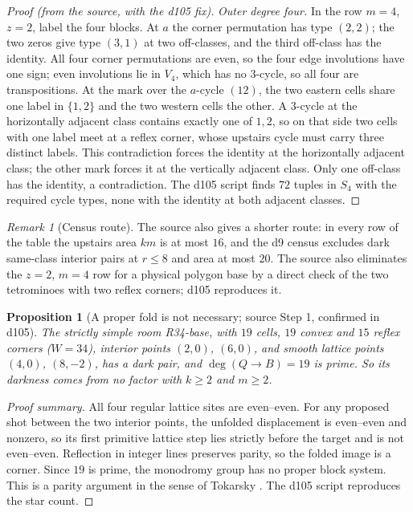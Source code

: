 \documentclass[11pt]{article}
\newtheorem{proposition}{Proposition}
\theoremstyle{definition}
\theoremstyle{remark}
\newtheorem{remark}{Remark}
\newcommand{\src}[1]{\path{#1}}
\begin{document}
\begin{proof}[Proof (from the source, with the d105 fix)]
\emph{Outer degree four.} In the row $m=4$, $z=2$, label the four blocks. At
$a$ the corner permutation has type $(2,2)$; the two zeros give type $(3,1)$ at
two off-classes, and the third off-class has the identity. All four corner
permutations are even, so the four edge involutions have one sign; even
involutions lie in $V_4$, which has no $3$-cycle, so all four are
transpositions. At the mark over the $a$-cycle $(12)$, the two eastern cells
share one label in $\{1,2\}$ and the two western cells the other. A $3$-cycle
at the horizontally adjacent class contains exactly one of $1,2$, so on that
side two cells with one label meet at a reflex corner, whose upstairs cycle
must carry three distinct labels. This contradiction forces the identity at the
horizontally adjacent class; the other mark forces it at the vertically
adjacent class. Only one off-class has the identity, a contradiction. The d105
script finds $72$ tuples in $S_4$ with the required cycle types, none with the
identity at both adjacent classes.
\end{proof}

\begin{remark}[Census route]
The source also gives a shorter route: in every row of the table the upstairs
area $km$ is at most $16$, and the d9 census excludes dark same-class interior
pairs at $r\le 8$ and area at most $20$. The source also eliminates the
$z=2$, $m=4$ row for a physical polygon base by a direct check of the two
tetrominoes with two reflex corners; d105 reproduces it.
\end{remark}

\begin{proposition}[A proper fold is not necessary; source Step 1, confirmed in d105]\label{prop:R34}
The strictly simple room R34-base, with $19$ cells, $19$ convex and $15$ reflex
corners ($W=34$), interior points $(2,0)$, $(6,0)$, and smooth lattice points
$(4,0)$, $(8,-2)$, has a dark pair, and $\deg(Q\to B)=19$ is prime. So its
darkness comes from no factor with $k\ge 2$ and $m\ge 2$.
\end{proposition}
\begin{proof}[Proof summary]
All four regular lattice sites are even--even. For any proposed shot between
the two interior points, the unfolded displacement is even--even and nonzero,
so its first primitive lattice step lies strictly before the target and is not
even--even. Reflection in integer lines preserves parity, so the folded image
is a corner. Since $19$ is prime, the monodromy group has no proper block
system. This is a parity argument in the sense of Tokarsky \cite{Tokarsky}.
The d105 script \src{d105-review-fold/step1.py} reproduces the star count.
\end{proof}
\end{document}
